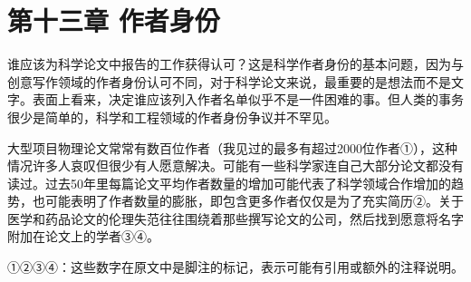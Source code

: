 \section*{第十三章 作者身份}
谁应该为科学论文中报告的工作获得认可？这是科学作者身份的基本问题，因为与创意写作领域的作者身份认可不同，对于科学论文来说，最重要的是想法而不是文字。表面上看来，决定谁应该列入作者名单似乎不是一件困难的事。但人类的事务很少是简单的，科学和工程领域的作者身份争议并不罕见。

大型项目物理论文常常有数百位作者（我见过的最多有超过2000位作者①），这种情况许多人哀叹但很少有人愿意解决。可能有一些科学家连自己大部分论文都没有读过。过去50年里每篇论文平均作者数量的增加可能代表了科学领域合作增加的趋势，也可能表明了作者数量的膨胀，即包含更多作者仅仅是为了充实简历②。关于医学和药品论文的伦理失范往往围绕着那些撰写论文的公司，然后找到愿意将名字附加在论文上的学者③④。 

①②③④：这些数字在原文中是脚注的标记，表示可能有引用或额外的注释说明。

